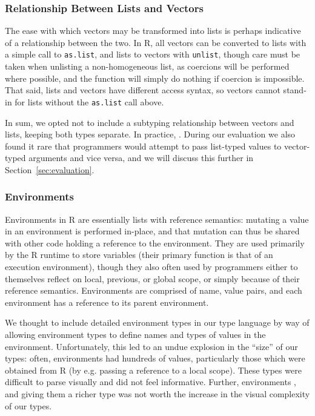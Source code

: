 \documentclass[acmsmall,review,anonymous]{acmart}\settopmatter{printfolios=true,printccs=false,printacmref=false}
\newcommand{\code}[1]{{\lstinline[style=Rin]!#1!}\xspace}
\begin{document}
%
%
\subsubsection{Relationship Between Lists and Vectors}


The ease with which vectors may be transformed into lists is perhaps indicative of a relationship between the two.
In R, all vectors can be converted to lists with a simple call to \code{as.list}, and lists to vectors with \code{unlist}, though care must be taken when unlisting a non-homogeneous list, as coercions will be performed where possible, and the function will simply do nothing if coercion is impossible.
That said, lists and vectors have different access syntax, so vectors cannot stand-in for lists without the \code{as.list} call above.

In sum, we opted not to include a subtyping relationship between vectors and lists, keeping both types separate.
In practice, \AT{how often do \code{T[] | list<T>} types occur?}.
During our evaluation we also found it rare that programmers would attempt to pass list-typed values to vector-typed arguments and vice versa, and we will discuss this further in Section~\ref{sec:evaluation}.

%
%
\subsubsection{Environments}

Environments in R are essentially lists with reference semantics: mutating a value in an environment is performed in-place, and that mutation can thus be shared with other code holding a reference to the environment.
They are used primarily by the R runtime to store variables (their primary function is that of an execution environment), though they also often used by programmers either to themselves reflect on local, previous, or global scope, or simply because of their reference semantics.
Environments are comprised of name, value pairs, and each environment has a reference to its parent environment.

We thought to include detailed environment types in our type language by way of allowing environment types to define names and types of values in the environment.
Unfortunately, this led to an undue explosion in the ``size'' of our types: 
often, environments had hundreds of values, particularly those which were obtained from R (by e.g. passing a reference to a local scope).
These types were difficult to parse visually and did not feel informative.
Further, environments , and giving them a richer type was not worth the increase in the visual complexity of our types.
\end{document}
